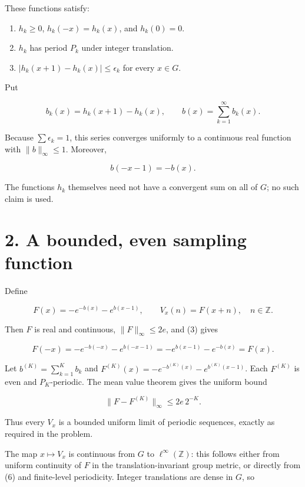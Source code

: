 \documentclass[11pt,a4paper]{article}
\providecommand{\tightlist}{\setlength{\itemsep}{0pt}\setlength{\parskip}{0pt}}
\begin{document}
These functions satisfy:

\begin{enumerate}
\def\labelenumi{\arabic{enumi}.}
\tightlist
\item
  \(h_k\geq0\), \(h_k(-x)=h_k(x)\), and \(h_k(0)=0\).
\item
  \(h_k\) has period \(P_k\) under integer translation.
\item
  \(|h_k(x+1)-h_k(x)|\leq\epsilon_k\) for every \(x\in G\).
\end{enumerate}

Put

\[
b_k(x)=h_k(x+1)-h_k(x),\qquad
b(x)=\sum_{k=1}^\infty b_k(x).
\tag{2}
\]

Because \(\sum\epsilon_k=1\), this series converges uniformly to a
continuous real function with \(\|b\|_\infty\leq1\). Moreover,

\[
b(-x-1)=-b(x).
\tag{3}
\]

The functions \(h_k\) themselves need not have a convergent sum on all
of \(G\); no such claim is used.

\hypertarget{1018-a-bounded-even-sampling-function}{%
\section{2. A bounded, even sampling
function}\label{1018-a-bounded-even-sampling-function}}

Define

\[
F(x)=-e^{-b(x)}-e^{b(x-1)},\qquad
V_x(n)=F(x+n),\quad n\in\mathbb Z.
\tag{4}
\]

Then \(F\) is real and continuous, \(\|F\|_\infty\leq2e\), and (3) gives

\[
F(-x)=-e^{-b(-x)}-e^{b(-x-1)}
=-e^{b(x-1)}-e^{-b(x)}=F(x).
\tag{5}
\]

Let \(b^{(K)}=\sum_{k=1}^K b_k\) and
\(F^{(K)}(x)=-e^{-b^{(K)}(x)}-e^{b^{(K)}(x-1)}\). Each \(F^{(K)}\) is
even and \(P_K\)-periodic. The mean value theorem gives the uniform
bound

\[
\|F-F^{(K)}\|_\infty\leq2e\,2^{-K}.
\tag{6}
\]

Thus every \(V_x\) is a bounded uniform limit of periodic sequences,
exactly as required in the problem.

The map \(x\mapsto V_x\) is continuous from \(G\) to
\(\ell^\infty(\mathbb Z)\): this follows either from uniform continuity
of \(F\) in the translation-invariant group metric, or directly from (6)
and finite-level periodicity. Integer translations are dense in \(G\),
so
\end{document}
